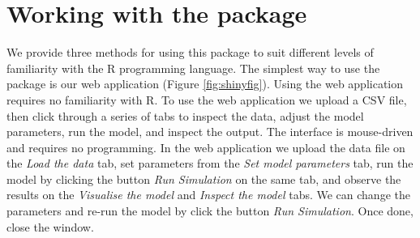 \documentclass[]{elsarticle} %
\begin{document}
\FloatBarrier

\hypertarget{working-with-the-package}{%
\section{Working with the package}\label{working-with-the-package}}

We provide three methods for using this package to suit different levels of familiarity with the R programming language. The simplest way to use the package is our web application (Figure \ref{fig:shinyfig}). Using the web application requires no familiarity with R. To use the web application we upload a CSV file, then click through a series of tabs to inspect the data, adjust the model parameters, run the model, and inspect the output. The interface is mouse-driven and requires no programming. In the web application we upload the data file on the \emph{Load the data} tab, set parameters from the \emph{Set model parameters} tab, run the model by clicking the button \emph{Run Simulation} on the same tab, and observe the results on the \emph{Visualise the model} and \emph{Inspect the model} tabs. We can change the parameters and re-run the model by click the button \emph{Run Simulation}. Once done, close the window.
\end{document}
